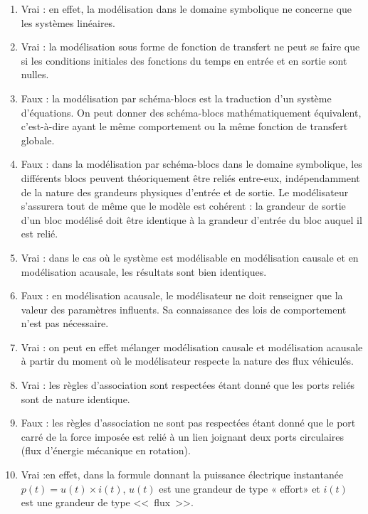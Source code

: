\documentclass[10pt,fleqn]{article} %
\begin{document}
\fi

\ifprof
\begin{corrige}
\begin{enumerate}
\item Vrai : en effet, la modélisation dans le domaine symbolique ne concerne que les systèmes linéaires.
\item Vrai : la modélisation sous forme de fonction de transfert ne peut se faire que si les conditions initiales des fonctions du temps en entrée et en sortie sont nulles.
\item Faux : la modélisation par schéma-blocs est la traduction d’un système d’équations. On peut donner des schéma-blocs mathématiquement équivalent, c’est-à-dire ayant le même comportement ou la même fonction de transfert globale.
\item Faux : dans la modélisation par schéma-blocs dans le domaine symbolique, les différents blocs peuvent théoriquement être reliés entre-eux, indépendamment de la nature des grandeurs physiques d’entrée et de sortie. Le modélisateur s’assurera tout de même que le modèle est cohérent : la grandeur de sortie d’un bloc modélisé doit être identique à la grandeur d’entrée du bloc auquel il est relié.
\item Vrai : dans le cas où le système est modélisable en modélisation causale et en modélisation acausale, les résultats sont bien identiques.
\item Faux : en modélisation acausale, le modélisateur ne doit renseigner que la valeur des paramètres influents. Sa connaissance des lois de comportement n’est pas nécessaire.
\item Vrai : on peut en effet mélanger modélisation causale et modélisation acausale à partir du moment où le modélisateur respecte la nature des flux véhiculés.
\item Vrai : les règles d’association sont respectées étant donné que les ports reliés sont de nature identique.
\item Faux : les règles d’association ne sont pas respectées étant donné que le port carré de la force imposée est relié à un lien joignant deux ports circulaires (flux d’énergie mécanique en rotation).
\item Vrai :en effet, dans la formule donnant la puissance électrique instantanée $p(t)=u(t) \times i(t)$, $u(t)$ est une grandeur de type « effort» et $i(t)$ est une grandeur de type <<~flux~>>.
\end{enumerate}
\end{corrige}
\else
\fi
\end{document}
